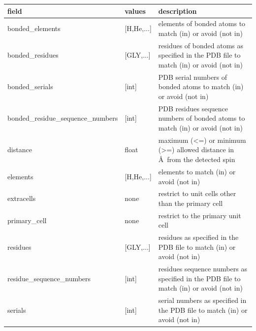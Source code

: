 \documentclass{book}
\begin{document}
\begin{center}
\begin{tabular}{| m{20em} | m{1.5cm}| m{7cm} |}
 \hline 
 \textbf{field} & \textbf{values} & \textbf{description} \\ 
 \hline 
 bonded\_elements & [H,He,...] & elements of bonded atoms 
 to match (in) or avoid (not in)\\
 \hline 
 bonded\_residues & [GLY,...] & residues of bonded atoms 
 as specified in the PDB file to match (in) or avoid (not in)\\
 \hline 
 bonded\_serials & [int] & PDB serial numbers of bonded atoms 
 to match (in) or avoid (not in)\\
 \hline 
 bonded\_residue\_sequence\_numbers & [int] & PDB residues sequence numbers 
 of bonded atoms to match (in) or avoid (not in)\\
 \hline 
 distance & float & maximum (<=) or minimum (>=) allowed distance in 
 \AA~from the detected spin
 \\
 \hline 
 elements & [H,He,...] & elements to match (in) or avoid (not in)\\
 \hline 
 extracells & none & restrict to unit cells other than the primary cell\\
 \hline 
 primary\_cell & none & restrict to the primary unit cell\\
 \hline 
 residues & [GLY,...] & residues as specified in the PDB file
 to match (in) or avoid (not in)\\
 \hline 
 residue\_sequence\_numbers & [int] & residues sequence numbers 
 as specified in the PDB file to match (in) or avoid (not in)\\
 \hline 
 serials & [int] & serial numbers as specified in the PDB file
 to match (in) or avoid (not in)\\
 \hline 
\end{tabular}
\end{center}  
\end{document}
